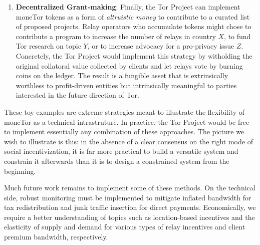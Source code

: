 \begin{enumerate}
\item \textbf{Decentralized Grant-making}: Finally, the Tor Project can
implement moneTor tokens as a form of \emph{altruistic money} to contribute to a
curated list of proposed projects. Relay operators who accumulate tokens might
chose to contribute a program to increase the number of relays in country $X$,
to fund Tor research on topic $Y$, or to increase advocacy for a pro-privacy
issue $Z$. Concretely, the Tor Project would implement this strategy by
witholding the original collatoral value collected by clients and let relays
vote by burning coins on the ledger. The result is a fungible asset that is
extrinsically worthless to profit-driven entities but intrinsically meaningful
to parties interested in the future direction of Tor.

\end{enumerate}

These toy examples are extreme strategies meant to illustrate the flexibility of
moneTor as a technical intrastruture. In practice, the Tor Project would be free
to implement essentially any combination of these approaches. The picture we
wish to illustrate is this: in the absence of a clear consensus on the right
mode of social incentivization, it is far more practical to build a versatile
system and constrain it afterwards than it is to design a constrained system
from the beginning.

Much future work remains to implement some of these methods. On the technical
side, robust monitoring must be implemented to mitigate inflated bandwidth for
tax redistribution and junk traffic insertion for direct payments. Economically,
we require a better understanding of topics such as location-based incentives
and the elasticity of supply and demand for various types of relay incentives
and client premium bandwidth, respectively.

